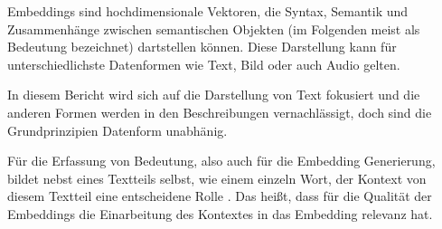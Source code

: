 \documentclass[../main.tex]{subfiles}
\begin{document}
Embeddings sind hochdimensionale Vektoren, die Syntax, Semantik und Zusammenhänge zwischen semantischen Objekten (im Folgenden meist als Bedeutung bezeichnet) dartstellen können.
Diese Darstellung kann für unterschiedlichste Datenformen wie Text, Bild oder auch Audio gelten.
\cite{mikolov2013efficient}

In diesem Bericht wird sich auf die Darstellung von Text fokusiert und die anderen Formen werden in den Beschreibungen vernachlässigt, doch sind die Grundprinzipien Datenform unabhänig.

Für die Erfassung von Bedeutung, also auch für die Embedding Generierung, bildet nebst eines Textteils selbst, wie einem einzeln Wort, der Kontext von diesem Textteil eine entscheidene Rolle \cite{rubenstein1965contextual}.
Das heißt, dass für die Qualität der Embeddings die Einarbeitung des Kontextes in das Embedding relevanz hat.
\cite{huang-etal-2012-improving}
\end{document}
